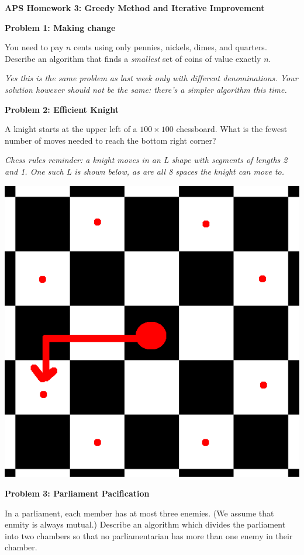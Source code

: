 \documentclass[]{article}
\begin{document}
\textbf{APS Homework 3: Greedy Method and Iterative Improvement}

\medskip
\textbf{Problem 1: Making change}

You need to pay $n$ cents using only pennies, nickels, dimes, and quarters.
Describe an algorithm that finds a \textit{smallest} set of coins of value
exactly $n$.

\textit{Yes this is the same problem as last week only with different denominations.
Your solution however should not be the same: there's a simpler algorithm this time.}

\medskip
\textbf{Problem 2: Efficient Knight}

A knight starts at the upper left of a $100 \times 100$ chessboard. What is the
fewest number of moves needed to reach the bottom right corner?

\textit{Chess rules reminder: a knight moves in an L shape with segments of lengths 2 and 1. One such L is shown
below, as are all 8 spaces the knight can move to.}

\includegraphics[scale=.2,angle=90]{knight}

\medskip
\textbf{Problem 3: Parliament Pacification}

In a parliament, each member has at most three enemies. (We assume that enmity
is always mutual.) Describe an algorithm which divides the parliament into two
chambers so that no parliamentarian has more than one enemy in their chamber.
\end{document}
